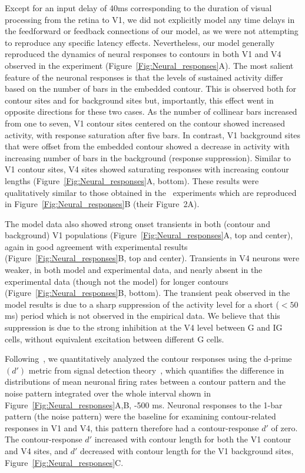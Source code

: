 Except for an input delay of 40ms corresponding to the duration of
visual processing from the retina to V1, we did not explicitly model
any time delays in the feedforward or feedback connections of
our model, as we were not attempting to reproduce 
any specific latency effects.
Nevertheless, our model generally reproduced the dynamics of neural
responses to contours in both V1 and V4 observed in the
\cite{Chen_etal14} experiment (Figure~\ref{Fig:Neural_responses}A).
The most salient feature of the neuronal responses is that the levels
of sustained activity differ based on the number of bars in the
embedded contour. This is observed both for contour sites and for
background sites but, importantly, this effect went in opposite
directions for these two cases.  As the number of collinear bars
increased from one to seven, V1 contour sites centered on the contour
showed increased activity, with response saturation after five
bars. In contrast, V1 background sites that were offset from the
embedded contour showed a decrease in activity with increasing number
of bars in the background (response suppression). Similar to V1
contour sites, V4 sites showed saturating responses with increasing
contour lengths (Figure~\ref{Fig:Neural_responses}A, bottom).  These
results were qualitatively similar to those obtained in
the~\cite{Chen_etal14} experiments which are reproduced in
Figure~\ref{Fig:Neural_responses}B (their Figure~2A).

The model data also showed strong onset transients in both (contour
and background) V1 populations (Figure~\ref{Fig:Neural_responses}A,
top and center), again in good agreement with experimental results
(Figure~\ref{Fig:Neural_responses}B, top and center). Transients in V4
neurons were weaker, in both model and experimental data, and nearly
absent in the experimental data (though not the model) for longer
contours (Figure~\ref{Fig:Neural_responses}B, bottom).
The transient peak observed in the model results
is due to a sharp suppression of the activity level for a short
($<50$ms) period which is not observed in the empirical data. We
believe that this suppression is due to the  strong inhibition at the
V4 level between G and IG cells, without equivalent
excitation between different G cells.

Following~\cite{Chen_etal14}, 
we quantitatively analyzed the contour responses using the d-prime
$(d')$ metric from signal detection theory~\citep{Green_Swets66}, which
quantifies the difference in distributions of mean neuronal firing
rates between a contour pattern and the noise pattern integrated over
the whole interval shown in Figure~\ref{Fig:Neural_responses}A,B, -500 ms.  Neuronal responses to the 1-bar pattern (the noise pattern)
were the baseline for examining contour-related responses in V1 and
V4, this pattern therefore had a contour-response $d'$ of zero. The
contour-response $d'$ increased with contour length for both the V1
contour and V4 sites, and $d'$ decreased with contour length for the V1
background sites, Figure~\ref{Fig:Neural_responses}C.

